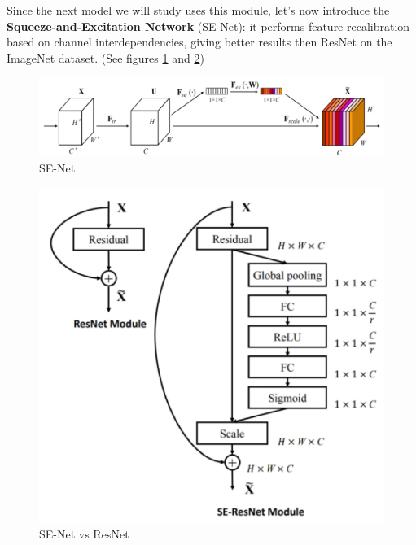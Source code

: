 Since the next model we will study uses this module, let's now introduce the  \textbf{Squeeze-and-Excitation Network} (SE-Net): it performs feature recalibration based on channel interdependencies, giving better results then ResNet on the ImageNet dataset. (See figures \ref{fig:se-net-1} and \ref{fig:se-net-2})

\begin{minipage}{.65\textwidth}
    \begin{figure}[H]
        \centering
        \includegraphics[width=.95\linewidth]{images/se-net-1}
        \caption[SE-Net]{SE-Net}
        \label{fig:se-net-1}
    \end{figure}
\end{minipage}
\begin{minipage}{.35\textwidth}
    \begin{figure}[H]
        \centering
        \includegraphics[width=.95\linewidth]{images/se-net-2}
        \caption[SE-Net vs ResNet]{SE-Net vs ResNet}
        \label{fig:se-net-2}
    \end{figure}
\end{minipage}

